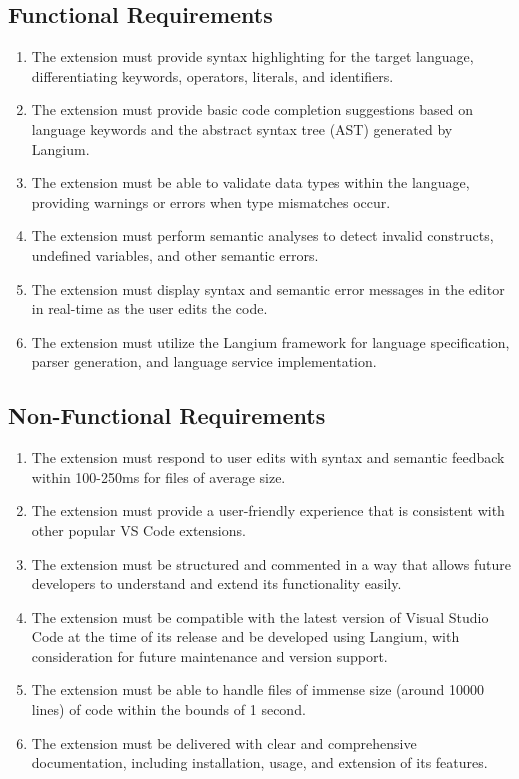 \begin{multicols}{2}
  \subsection*{Functional Requirements}
  \begin{enumerate}
    \item The extension must provide syntax highlighting for the target language, differentiating keywords, operators, literals, and identifiers.
    \item The extension must provide basic code completion suggestions based on language keywords and the abstract syntax tree (AST) generated by Langium.
    \item The extension must be able to validate data types within the language, providing warnings or errors when type mismatches occur.
    \item The extension must perform semantic analyses to detect invalid constructs, undefined variables, and other semantic errors.
    \item The extension must display syntax and semantic error messages in the editor in real-time as the user edits the code.
    \item The extension must utilize the Langium framework for language specification, parser generation, and language service implementation.
  \end{enumerate}

  \columnbreak

  \subsection*{Non-Functional Requirements}
  \begin{enumerate}
    \item The extension must respond to user edits with syntax and semantic feedback within 100-250ms for files of average size.
    \item The extension must provide a user-friendly experience that is consistent with other popular VS Code extensions.
    \item The extension must be structured and commented in a way that allows future developers to understand and extend its functionality easily.
    \item The extension must be compatible with the latest version of Visual Studio Code at the time of its release and be developed using Langium, with consideration for future maintenance and version support.
    \item The extension must be able to handle files of immense size (around 10000 lines) of code within the bounds of 1 second.
    \item The extension must be delivered with clear and comprehensive documentation, including installation, usage, and extension of its features.
  \end{enumerate}
\end{multicols}

